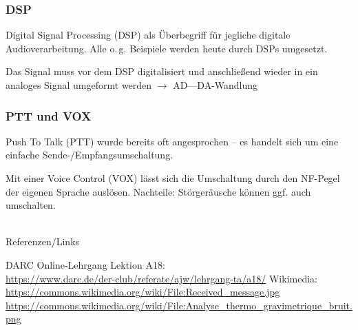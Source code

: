 \begin{frame}
  \frametitle{DSP}

  Digital Signal Processing (DSP) als Überbegriff für jegliche digitale
  Audioverarbeitung. Alle o.\,g. Beispiele werden heute durch DSPs umgesetzt.

  \bigskip

  Das Signal muss vor dem DSP digitalisiert und anschließend wieder in ein
  analoges Signal umgeformt werden $\rightarrow$ AD---DA-Wandlung

\end{frame}

\begin{frame}
  \frametitle{PTT und VOX}

  Push To Talk (PTT) wurde bereits oft angesprochen -- es handelt sich um eine
  einfache Sende-/Empfangsumschaltung.

  \bigskip

  Mit einer Voice Control (VOX) lässt sich die Umschaltung durch den NF-Pegel
  der eigenen Sprache auslösen. Nachteile: Störgeräusche können ggf. auch
  umschalten.

\end{frame}

\renewcommand{\refname}{Referenzen}

\hypertarget{refs}{}
\textcolor{white}{} \\ %
\Large Referenzen/Links
\footnotesize

\begin{thebibliography}{}
    DARC Online-Lehrgang Lektion A18:\\
    \url{https://www.darc.de/der-club/referate/ajw/lehrgang-ta/a18/}
      Wikimedia:\\
    \url{https://commons.wikimedia.org/wiki/File:Received_message.jpg}\\
    \url{https://commons.wikimedia.org/wiki/File:Analyse_thermo_gravimetrique_bruit.png}
\end{thebibliography}


